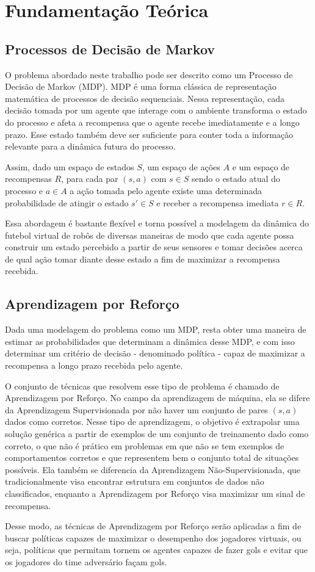 
\chapter{Fundamentação Teórica\label{chap:FundamentacaoMatematica}}



\section{Processos de Decisão de Markov}

O problema abordado neste trabalho pode ser descrito como um Processo de Decisão de Markov (MDP).
MDP é uma forma clássica de representação matemática de processos de decisão sequenciais.
Nessa representação, cada decisão tomada por um agente que interage com o ambiente transforma o estado do processo e afeta a recompensa que o agente recebe imediatamente e a longo prazo.
Esse estado também deve ser suficiente para conter toda a informação relevante para a dinâmica futura do processo.

Assim, dado um espaço de estados $S$, um espaço de ações $A$ e um espaço de recompensas $R$, para cada par $(s, a)$ com $s \in S$ sendo o estado atual do processo e $a \in A$ a ação tomada pelo agente existe uma determinada probabilidade de atingir o estado $s' \in S$ e receber a recompensa imediata $r \in R$\cite{sutton2018reinforcement}.

Essa abordagem é bastante flexível e torna possível a modelagem da dinâmica do futebol virtual de robôs de diversas maneiras de modo que cada agente possa construir um estado percebido a partir de seus sensores e tomar decisões acerca de qual ação tomar diante desse estado a fim de maximizar a recompensa recebida.

\section{Aprendizagem por Reforço}

Dada uma modelagem do problema como um MDP, resta obter uma maneira de estimar as probabilidades que determinam a dinâmica desse MDP, e com isso determinar um critério de decisão - denominado política - capaz de maximizar a recompensa a longo prazo recebida pelo agente.

O conjunto de técnicas que resolvem esse tipo de problema é chamado de Aprendizagem por Reforço.
No campo da aprendizagem de máquina, ela se difere da Aprendizagem Supervisionada por não haver um conjunto de pares $(s, a)$ dados como corretos.
Nesse tipo de aprendizagem, o objetivo é extrapolar uma solução genérica a partir de exemplos de um conjunto de treinamento dado como correto, o que não é prático em problemas em que não se tem exemplos de comportamentos corretos e que representem bem o conjunto total de situações possíveis.
Ela também se diferencia da Aprendizagem Não-Supervisionada, que tradicionalmente visa encontrar estrutura em conjuntos de dados não classificados, enquanto a Aprendizagem por Reforço visa maximizar um sinal de recompensa\cite{sutton2018reinforcement}.

Desse modo, as técnicas de Aprendizagem por Reforço serão aplicadas a fim de buscar políticas capazes de maximizar o desempenho dos jogadores virtuais, ou seja, políticas que permitam tornem os agentes capazes de fazer gols e evitar que os jogadores do time adversário façam gols.

